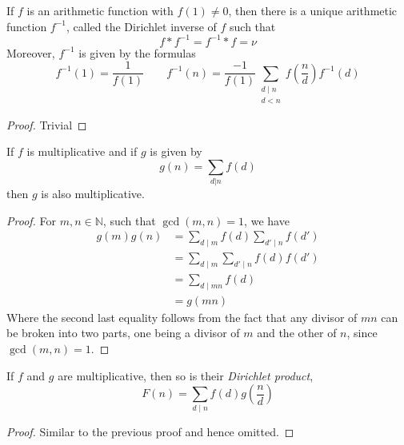 \begin{theorem}
    If $f$ is an arithmetic function with $f(1)\ne 0$, then there is a unique arithmetic function $f^{-1}$, called the Dirichlet inverse of $f$ such that 
    \begin{equation*}
        f * f^{-1} = f^{-1} * f = \nu
    \end{equation*}
    Moreover, $f^{-1}$ is given by the formulas
    \begin{equation*}
        f^{-1}(1) = \frac{1}{f(1)} \qquad f^{-1}(n) = \frac{-1}{f(1)}\sum_{\substack{d\mid n\\ d < n}}f\left(\frac{n}{d}\right)f^{-1}(d)
    \end{equation*}
\end{theorem}
\begin{proof}
    Trivial
\end{proof}

\begin{theorem}
    If $f$ is multiplicative and if $g$ is given by 
    \begin{equation*}
        g(n) = \sum_{d|n} f(d)
    \end{equation*}
    then $g$ is also multiplicative.
\end{theorem}
\begin{proof}
    For $m,n\in\mathbb{N}$, such that $\gcd(m,n) = 1$, we have 
    \begin{align*}
        g(m)g(n) &= \sum_{d\mid m}f(d)\sum_{d'\mid n}f(d')\\
        &= \sum_{d\mid m}\sum_{d'\mid n}f(d)f(d')\\
        &= \sum_{d\mid mn}f(d)\\
        &= g(mn)
    \end{align*}
    Where the second last equality follows from the fact that any divisor of $mn$ can be broken into two parts, one being a divisor of $m$ and the other of $n$, since $\gcd(m,n) = 1$.
\end{proof}

\begin{theorem}
    If $f$ and $g$ are multiplicative, then so is their \textit{Dirichlet product},
    \begin{equation*}
        F(n) = \sum_{d\mid n}f(d)g\left(\frac{n}{d}\right)
    \end{equation*}
\end{theorem}
\begin{proof}
    Similar to the previous proof and hence omitted.
\end{proof}

